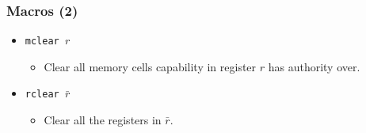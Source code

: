 \documentclass{beamer}
\begin{document}
\begin{frame}
  \frametitle{Macros (2)}
  \begin{itemize}[<+->]
  \item \texttt{mclear $r$}
    \begin{itemize}
    \item Clear all memory cells capability in register $r$ has authority over.
    \end{itemize}
  \item \texttt{rclear $\bar{r}$}
    \begin{itemize}
    \item Clear all the registers in $\bar{r}$.
    \end{itemize}
  \end{itemize}
\end{frame}
\end{document}
